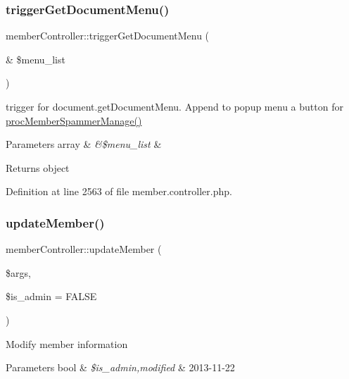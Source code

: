\hypertarget{classmemberController_a4f6ca6a2a8db362cac531920762a94f9}{}\label{classmemberController_a4f6ca6a2a8db362cac531920762a94f9} 
\subsubsection{\texorpdfstring{trigger\+Get\+Document\+Menu()}{triggerGetDocumentMenu()}}
{\footnotesize\ttfamily member\+Controller\+::trigger\+Get\+Document\+Menu (\begin{DoxyParamCaption}\item[{\&}]{\$menu\+\_\+list }\end{DoxyParamCaption})}

trigger for document.\+get\+Document\+Menu. Append to popup menu a button for \hyperlink{classmemberController_a99f87aecac7ae283cec747a007df88b8}{proc\+Member\+Spammer\+Manage()}


\begin{DoxyParams}[1]{Parameters}
array & {\em \&\$menu\+\_\+list} & \\
\hline
\end{DoxyParams}
\begin{DoxyReturn}{Returns}
object 
\end{DoxyReturn}


Definition at line 2563 of file member.\+controller.\+php.

\hypertarget{classmemberController_ac1ad3397eda0a695046b023a14d25496}{}\label{classmemberController_ac1ad3397eda0a695046b023a14d25496} 
\subsubsection{\texorpdfstring{update\+Member()}{updateMember()}}
{\footnotesize\ttfamily member\+Controller\+::update\+Member (\begin{DoxyParamCaption}\item[{}]{\$args,  }\item[{}]{\$is\+\_\+admin = {\ttfamily FALSE} }\end{DoxyParamCaption})}

Modify member information


\begin{DoxyParams}[1]{Parameters}
bool & {\em \$is\+\_\+admin,modified} & 2013-\/11-\/22 \\
\hline
\end{DoxyParams}


